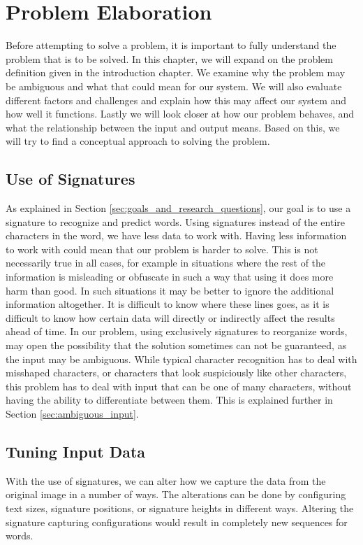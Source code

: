 
\chapter{Problem Elaboration}
\label{ch:problem}
Before attempting to solve a problem, it is important to fully understand the problem that is to be solved. In this chapter, we will expand on the problem definition given in the introduction chapter. We examine why the problem may be ambiguous and what that could mean for our system. We will also evaluate different factors and challenges and explain how this may affect our system and how well it functions. Lastly we will look closer at how our problem behaves, and what the relationship between the input and output means. Based on this, we will try to find a conceptual approach to solving the problem.


\section{Use of Signatures}
As explained in Section \ref{sec:goals_and_research_questions}, our goal is to use a signature to recognize and predict words. Using signatures instead of the entire characters in the word, we have less data to work with. Having less information to work with could mean that our problem is harder to solve. This is not necessarily true in all cases, for example in situations where the rest of the information is misleading or obfuscate in such a way that using it does more harm than good. In such situations it may be better to ignore the additional information altogether. It is difficult to know where these lines goes, as it is difficult to know how certain data will directly or indirectly affect the results ahead of time. In our problem, using exclusively signatures to reorganize words, may open the possibility that the solution sometimes can not be guaranteed, as the input may be ambiguous. While typical character recognition has to deal with misshaped characters, or characters that look suspiciously like other characters, this problem has to deal with input that can be one of many characters, without having the ability to differentiate between them. This is explained further in Section \ref{sec:ambiguous_input}.


\section{Tuning Input Data}
\label{sec:tuning_input_data}
With the use of signatures, we can alter how we capture the data from the original image in a number of ways. The alterations can be done by configuring text sizes, signature positions, or signature heights in different ways. Altering the signature capturing configurations would result in completely new sequences for words.

